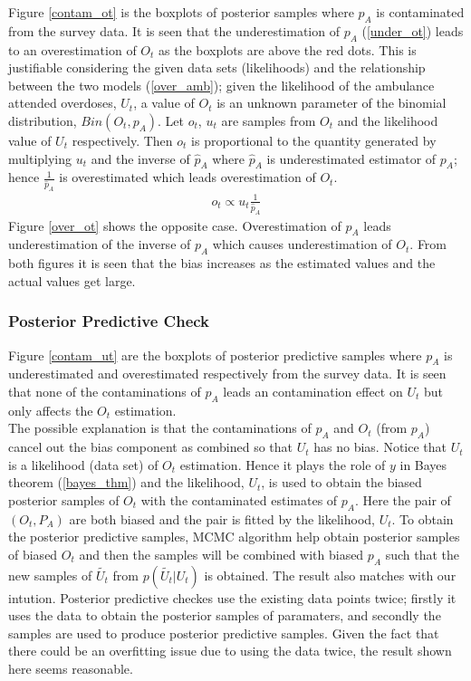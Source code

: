 \documentclass[]{article}
\begin{document}
\normalsize 
Figure \ref{contam_ot} is the boxplots of posterior samples where $p_A$ is contaminated from the survey data. It is seen that the underestimation of $p_A$ (\ref{under_ot}) leads to an overestimation of $O_t$ as the boxplots are above the red dots. This is justifiable considering the given data sets (likelihoods) and the relationship between the two models (\ref{over_amb}); given the likelihood of the ambulance attended overdoses, $U_t$, a value of $O_t$ is an unknown parameter of the binomial distribution, $Bin(O_t, p_A)$. Let $o_t$, $u_t$ are samples from $O_t$ and the likelihood value of $U_t$ respectively. Then $o_t$ is proportional to the quantity generated by multiplying $u_t$ and the inverse of $\hat{p}_{A}$ where $\hat{p}_{A}$ is underestimated estimator of $p_A$; hence $\frac{1}{\hat{p}_{A}}$ is overestimated which leads overestimation of $O_t$.
\begin{equation}
\label{ot.how.made}
\begin{aligned}
o_t \propto u_t \frac{1}{\hat{p}_{A}}
\end{aligned}
\end{equation}
Figure \ref{over_ot} shows the opposite case. Overestimation of $p_A$ leads underestimation of the inverse of $p_A$ which causes underestimation of $O_t$. From both figures it is seen that the bias increases as the estimated values and the actual values get large.\\

\subsubsection{Posterior Predictive Check}

Figure \ref{contam_ut} are the boxplots of posterior predictive samples where $p_A$ is underestimated and overestimated respectively from the survey data. It is seen that none of the contaminations of $p_A$ leads an contamination effect on $U_t$ but only affects the $O_t$ estimation.\\

The possible explanation is that the contaminations of  $p_A$ and $O_t$ (from $p_A$) cancel out the bias component as combined so that $U_t$ has no bias. Notice that $U_t$ is a likelihood (data set) of $O_t$ estimation. Hence it plays the role of $y$ in Bayes theorem (\ref{bayes_thm}) and the likelihood, $U_t$, is used to obtain the biased posterior samples of $O_t$ with the contaminated estimates of $p_A$. Here the pair of $(O_t, P_A)$ are both biased and the pair is fitted by the likelihood, $U_t$. To obtain the posterior predictive samples, MCMC algorithm help obtain posterior samples of biased $O_t$ and then the samples will be combined with biased $p_A$ such that the new samples of $\tilde{U_t}$ from $p(\tilde{U_t}|{U_t})$ is obtained.  The result also matches with our intution. Posterior predictive checkes use the existing data points twice; firstly it uses the data to obtain the posterior samples of paramaters, and secondly the samples are used to produce posterior predictive samples. Given the fact that there could be an overfitting issue due to using the data twice, the result shown here seems reasonable. 
\\
\end{document}
